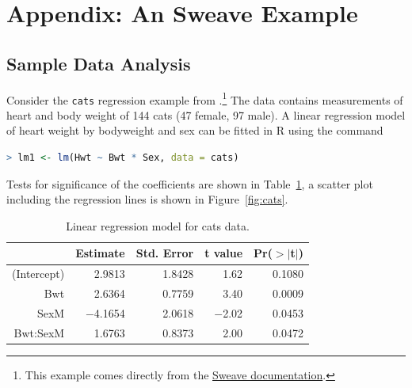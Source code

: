 \documentclass[11pt,article,oneside]{memoir}
\begin{document}
\newpage

\appendix

\section*{Appendix: An Sweave Example} %
\label{sec:an_sweave_example}
 
\subsection*{Sample Data Analysis} %
\label{sec:sample_data_analysis}
Consider the \texttt{cats} regression example from
\citet{venables02:_moder_applied_statis_s_plus}.\footnote{This example comes
  directly from the \href{http://www.ci.tuwien.ac.at/~leisch/Sweave/}{Sweave documentation}.} The data contains 
measurements of heart and body weight of 144 cats (47 female, 97 male). A
linear regression model of heart weight by bodyweight and sex can be fitted in
R using the command

\begin{lstlisting}[language=R,numbers=none]
> lm1 <- lm(Hwt ~ Bwt * Sex, data = cats)
\end{lstlisting}
\normalsize 
Tests for significance of the coefficients are shown in
Table~\ref{tab:coef}, a scatter plot including the regression lines is
shown in Figure~\ref{fig:cats}.


\begin{table}[ht]
\footnotesize
\begin{center}
\begin{tabular}{rrrrr}
\hline
 & Estimate & Std. Error & t value & Pr($>$$|$t$|$) \\
\hline
(Intercept) & 2.9813 & 1.8428 & 1.62 & 0.1080 \\
Bwt & 2.6364 & 0.7759 & 3.40 & 0.0009 \\
SexM & $-$4.1654 & 2.0618 & $-$2.02 & 0.0453 \\
Bwt:SexM & 1.6763 & 0.8373 & 2.00 & 0.0472 \\
\hline
\end{tabular}
\caption{\small Linear regression model for cats data.}
\label{tab:coef}
\end{center}
\end{table}
\normalsize 
\end{document}
